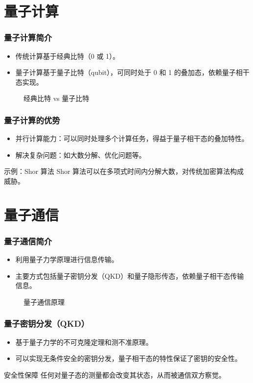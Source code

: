 \section{量子计算}
\begin{frame}
    \frametitle{量子计算简介}
    \begin{itemize}
        \item 传统计算基于经典比特（0 或 1）。
        \item 量子计算基于量子比特（qubit），可同时处于 0 和 1 的叠加态，依赖量子相干态实现。
    \end{itemize}
    \begin{figure}
        \centering
        \caption{经典比特 vs 量子比特}
    \end{figure}
\end{frame}

\begin{frame}
    \frametitle{量子计算的优势}
    \begin{itemize}
        \item 并行计算能力：可以同时处理多个计算任务，得益于量子相干态的叠加特性。
        \item 解决复杂问题：如大数分解、优化问题等。
    \end{itemize}
    \begin{exampleblock}{示例：Shor 算法}
        Shor 算法可以在多项式时间内分解大数，对传统加密算法构成威胁。
    \end{exampleblock}
\end{frame}

\section{量子通信}
\begin{frame}
    \frametitle{量子通信简介}
    \begin{itemize}
        \item 利用量子力学原理进行信息传输。
        \item 主要方式包括量子密钥分发（QKD）和量子隐形传态，依赖量子相干态传输信息。
    \end{itemize}
    \begin{figure}
        \centering
        \caption{量子通信原理}
    \end{figure}
\end{frame}

\begin{frame}
    \frametitle{量子密钥分发（QKD）}
    \begin{itemize}
        \item 基于量子力学的不可克隆定理和测不准原理。
        \item 可以实现无条件安全的密钥分发，量子相干态的特性保证了密钥的安全性。
    \end{itemize}
    \begin{alertblock}{安全性保障}
        任何对量子态的测量都会改变其状态，从而被通信双方察觉。
    \end{alertblock}
\end{frame}

